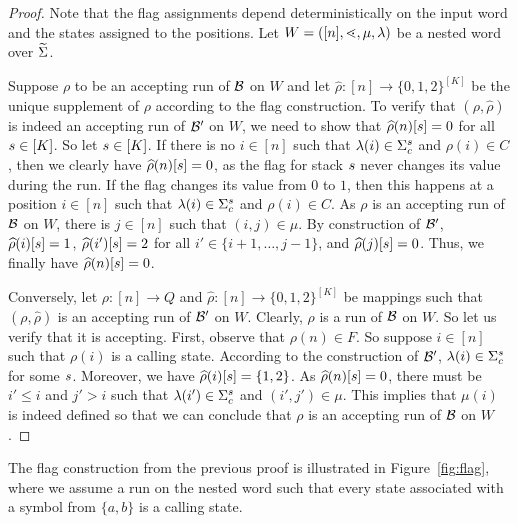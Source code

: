 \documentclass{LMCS}
\begin{document}
\begin{proof}
Note that the flag assignments depend deterministically on the input word and
the states assigned to the positions. Let $W = ([n],\mathord{\lessdot},\mu,\lambda)$ be
a nested word over $\widetilde{\Sigma}$.

Suppose $\rho$ to be an accepting run of $\mathcal{B}$ on $W$ and let $\widehat{\rho}:
[n] \rightarrow \{0,1,2\}^{[K]}$ be the unique supplement of $\rho$ according
to the flag construction. To verify that $(\rho,\widehat{\rho})$ is indeed an
accepting run of $\mathcal{B}'$ on $W$, we need to show that
$\widehat{\rho}(n)[s] = 0$ for all $s \in [K]$. So let $s \in
[K]$. If there is no $i \in [n]$ such that $\lambda(i) \in \Sigma_c^s$ and
$\rho(i) \in C$, then we clearly have $\widehat{\rho}(n)[s] = 0$, as the
flag for stack $s$ never changes its value during the run. If the flag
changes its value from $0$ to $1$, then this happens at a position $i \in [n]$
such that $\lambda(i) \in \Sigma_c^s$ and $\rho(i) \in C$. As $\rho$ is an
accepting run of $\mathcal{B}$ on $W$, there is $j \in [n]$ such that $(i,j) \in \mu$.
By construction of $\mathcal{B}'$, $\widehat{\rho}(i)[s] = 1$,
$\widehat{\rho}(i')[s] = 2$ for all $i' \in \{i + 1,\ldots,j-1\}$, and
$\widehat{\rho}(j)[s] = 0$. Thus, we finally have
$\widehat{\rho}(n)[s] = 0$.

Conversely, let $\rho: [n] \rightarrow Q$ and $\widehat{\rho}: [n] \rightarrow
\{0,1,2\}^{[K]}$ be mappings such that $(\rho,\widehat{\rho})$ is an
accepting run of $\mathcal{B}'$ on $W$. Clearly, $\rho$ is a run of $\mathcal{B}$ on $W$. So
let us verify that it is accepting. First, observe that $\rho(n) \in F$. So
suppose $i \in [n]$ such that $\rho(i)$ is a calling state. According to the
construction of $\mathcal{B}'$, $\lambda(i) \in \Sigma_c^s$ for some $s$.
Moreover, we have $\widehat{\rho}(i)[s] = \{1,2\}$. As
$\widehat{\rho}(n)[s] = 0$, there must be $i' \le i$ and $j' > i$ such
that $\lambda(i') \in \Sigma_c^s$ and $(i',j') \in \mu$. This implies that
$\mu(i)$ is indeed defined so that we can conclude that $\rho$ is an accepting
run of $\mathcal{B}$ on $W$.
\end{proof}
The flag construction from the previous proof is illustrated in
Figure~\ref{fig:flag}, where we assume a run on the nested word such that
every state associated with a symbol from $\{a,b\}$ is a calling state.
\end{document}
